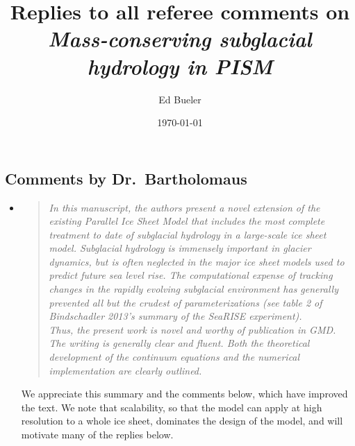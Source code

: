 \documentclass[11pt,reqno]{amsart}
\title[Replies to Referee Comments]{Replies to all referee comments on \\ \emph{Mass-conserving subglacial hydrology in PISM}}
\author{Ed Bueler}
\date{\today}
\newcommand{\reply}[2]{
\medskip\medskip
\item  \begin{quote}
\emph{#1}
\end{quote}

\medskip
\noindent #2}
\begin{document}
\maketitle

\thispagestyle{empty}


\subsection*{Comments by Dr.~Bartholomaus}\begin{itemize}

\reply{In this manuscript, the authors present a novel extension of the existing Parallel Ice Sheet Model that includes the most complete treatment to date of subglacial hydrology in a large-scale ice sheet model.  Subglacial hydrology is immensely important in glacier dynamics, but is often neglected in the major ice sheet models used to predict future sea level rise.  The computational expense of tracking changes in the rapidly evolving subglacial environment has generally prevented all but the crudest of parameterizations (see table 2 of Bindschadler 2013's summary of the SeaRISE experiment).\\
Thus, the present work is novel and worthy of publication in GMD.  The writing is generally clear and fluent.  Both the theoretical development of the continuum equations and the numerical implementation are clearly outlined.}
{We appreciate this summary and the comments below, which have improved the text.  We note that scalability, so that the model can apply at high resolution to a whole ice sheet, dominates the design of the model, and will motivate many of the replies below.}


\end{itemize}
\end{document}
